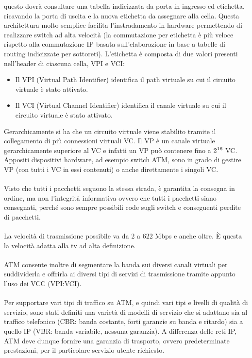 \documentclass[8pt]{extarticle}
\begin{document}
questo dovrà consultare una tabella indicizzata da porta in ingresso ed etichetta, ricavando la porta di 
uscita e la nuova etichetta da assegnare alla cella. Questa architettura molto semplice facilita 
l'instradamento in hardware permettendo di realizzare switch ad alta velocità (la commutazione 
per etichetta è più veloce rispetto alla commutazione IP basata sull'elaborazione in base a tabelle di 
routing indicizzate per sottoreti).
L'etichetta è composta di due valori presenti nell'header di ciascuna cella, VPI e VCI:\\
\begin{itemize}
    \item Il VPI (Virtual Path Identifier) identifica il path virtuale su cui il circuito virtuale è stato attivato.
    \item Il VCI (Virtual Channel Identifier) identifica il canale virtuale su cui il circuito virtuale è stato attivato.
\end{itemize}
\noindent
Gerarchicamente si ha che un circuito virtuale viene stabilito tramite il collegamento di più connessioni 
virtuali VC. Il VP è un canale virtuale gerarchicamente superiore al VC e infatti un VP può contenere 
fino a $2\textsuperscript{16}$ VC. Appositi dispositivi hardware, ad esempio switch ATM, sono in grado di gestire VP 
(con tutti i VC in essi contenuti) o anche direttamente i singoli VC.\\\\
Visto che tutti i pacchetti seguono la stessa strada, è garantita la consegna in ordine, ma non l'integrità 
informativa ovvero che tutti i pacchetti siano consegnati, perché sono sempre possibili code sugli switch 
e conseguenti perdite di pacchetti.\\\\
La velocità di trasmissione possibile va da 2 a 622 Mbps e anche oltre. È questa la velocità adatta alla 
tv ad alta definizione.\\\\
ATM consente inoltre di segmentare la banda sui diversi canali virtuali per suddividerla e offrirla ai 
diversi tipi di servizi di trasmissione tramite appunto l'uso dei VCC (VPI:VCI).\\\\
Per supportare vari tipi di traffico su ATM, e quindi vari tipi e livelli di qualità di servizio, 
sono stati definiti una varietà di modelli di servizio che si adattano sia al traffico telefonico 
(CBR: banda costante, forti garanzie su banda e ritardo) sia a quello IP (VBR: banda variabile, nessuna 
garanzia). A differenza delle reti IP, ATM deve dunque fornire una garanzia di trasporto, ovvero 
predeterminate prestazioni, per il particolare servizio utente richiesto.
\end{document}
